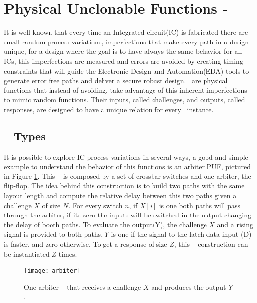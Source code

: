 \section{Physical Unclonable Functions - \pufs~}
\label{sec:pufs}
It is well known that every time an Integrated circuit(IC) is fabricated there are small random process variations, imperfections that make every path in a design unique, for a design where the goal is to have always the same behavior for all ICs, this imperfections are measured and errors are avoided by creating timing constraints that will guide the Electronic Design and Automation(EDA) tools to  generate error free paths and deliver a \rm{secure} robust design. \pufs~are physical functions that instead of avoiding, take advantage of this inherent imperfections to mimic random functions. Their inputs, called challenges, and outputs, called responses, are designed to have a unique relation for every \puf~instance. 

\subsection{\puf~ Types}
It is possible to explore IC process variations in several ways\cite{DBLP:phdbasesearchMaes12}, a good and simple example to understand the behavior of this functions is an arbiter PUF, pictured in Figure \ref{fig:arbiterpuf}.
This \puf~ is composed by a set of crossbar switches and  one arbiter, the flip-flop. The idea behind this construction is to build two paths with the same layout length and compute the relative delay between this two paths given a challenge $X$ of size $N$.  For every switch $n$, if $X[i]$  is one both paths will pass through the arbiter, if its zero the inputs will be switched in the output  changing the delay of booth paths. To evaluate the output(Y), the challenge $X$ and a rising signal is provided to both paths, $Y$ is one if the signal to the latch data input (D) is faster, and zero otherwise. To get a response of size $Z$, this \puf~ construction  can be instantiated $Z$ times.

\begin{figure}[!ht]
	\centering
	\texttt{[image: arbiter]}
	\caption{One arbiter \puf~ that receives a challenge $X$ and produces the output $Y$.}
	\label{fig:arbiterpuf}
\end{figure}


